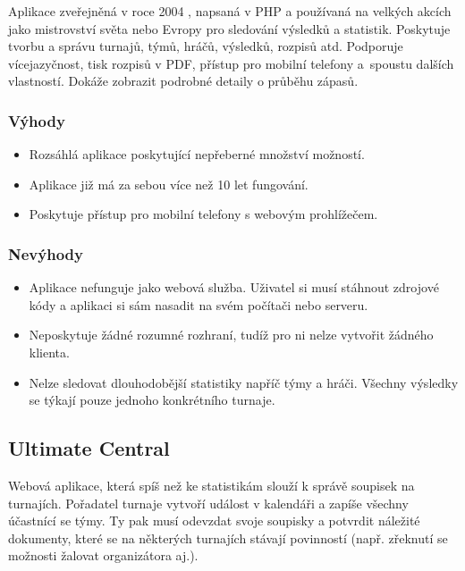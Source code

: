 Aplikace zveřejněná v roce 2004 \cite{ultimate-organizer}, napsaná v PHP a používaná na velkých akcích jako mistrovství světa nebo Evropy
pro sledování výsledků a statistik. Poskytuje tvorbu a správu turnajů, týmů, hráčů,
výsledků, rozpisů atd. Podporuje vícejazyčnost, tisk rozpisů v PDF, přístup pro mobilní telefony
a~spoustu dalších vlastností. Dokáže zobrazit podrobné detaily o průběhu zápasů.

\subsubsection*{Výhody}
\begin{itemize}
  \item Rozsáhlá aplikace poskytující nepřeberné množství možností.
  \item Aplikace již má za sebou více než 10 let fungování.
  \item Poskytuje přístup pro mobilní telefony s webovým prohlížečem.
\end{itemize}

\subsubsection*{Nevýhody}
\begin{itemize}
  \item Aplikace nefunguje jako webová služba. Uživatel si musí stáhnout zdrojové kódy a aplikaci si sám nasadit na svém počítači nebo serveru.
  \item Neposkytuje žádné rozumné rozhraní, tudíž pro ni nelze vytvořit žádného klienta.
  \item Nelze sledovat dlouhodobější statistiky napříč týmy a hráči. Všechny výsledky se týkají pouze jednoho konkrétního turnaje.
\end{itemize}

\subsection*{Ultimate Central}

Webová aplikace, která spíš než ke statistikám slouží k správě soupisek na turnajích. Pořadatel turnaje vytvoří událost
v kalendáři a zapíše všechny účastnící se týmy. Ty pak musí odevzdat svoje soupisky a potvrdit náležité dokumenty,
které se na některých turnajích stávají povinností (např. zřeknutí se možnosti žalovat organizátora aj.).

